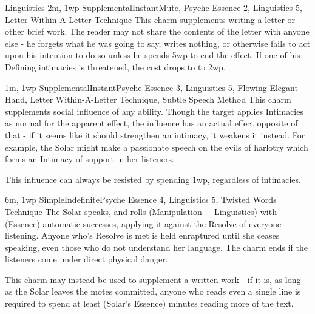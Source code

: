 \begin{Ability}{Linguistics}
  {2m, 1wp}
  {Supplemental}{Instant}{Mute, Psyche}
  {Essence 2, Linguistics 5, Letter-Within-A-Letter Technique}
  This charm supplements writing a letter or other brief work. The reader may not share the contents of the letter with anyone else - he forgets what he was going to say, writes nothing, or otherwise fails to act upon his intention to do so unless he spends 5wp to end the effect. If one of his Defining intimacies is threatened, the cost drops to to 2wp.

  {1m, 1wp}
  {Supplemental}{Instant}{Psyche}
  {Essence 3, Linguistics 5, Flowing Elegant Hand, Letter Within-A-Letter Technique, Subtle Speech Method}
  This charm supplements social influence of any ability. Though the target applies Intimacies as normal for the apparent effect, the influence has an actual effect opposite of that - if it seems like it should strengthen an intimacy, it weakens it instead. For example, the Solar might make a passionate speech on the evils of harlotry which forms an Intimacy of support in her listeners.

  This influence can always be resisted by spending 1wp, regardless of intimacies.

  {6m, 1wp}
  {Simple}{Indefinite}{Psyche}
  {Essence 4, Linguistics 5, Twisted Words Technique}
  The Solar speaks, and rolls (Manipulation + Linguistics) with (Essence) automatic successes, applying it against the Resolve of everyone listening. Anyone who's Resolve is met is held enraptured until she ceases speaking, even those who do not understand her language. The charm ends if the listeners come under direct physical danger.

  This charm may instead be used to supplement a written work - if it is, as long as the Solar leaves the motes committed, anyone who reads even a single line is required to spend at least (Solar's Essence) minutes reading more of the text.

\end{Ability}

